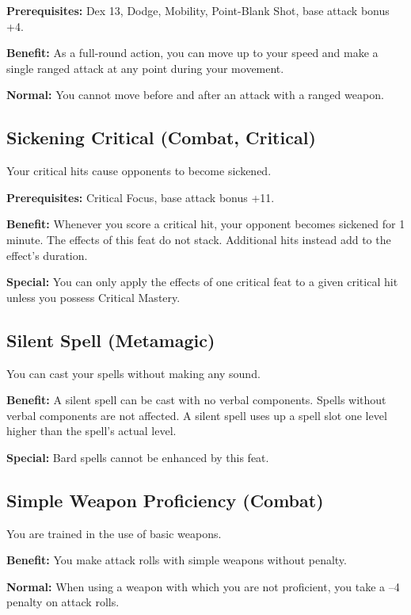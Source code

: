 \textbf{Prerequisites:} Dex 13, Dodge, Mobility, Point-Blank Shot, base attack bonus +4.
				
\textbf{Benefit:} As a full-round action, you can move up to your speed and make a single ranged attack at any point during your movement.
				
\textbf{Normal:} You cannot move before and after an attack with a ranged weapon.
				
\subsection{Sickening Critical (Combat, Critical)}

				
Your critical hits cause opponents to become sickened.
				
\textbf{Prerequisites:} Critical Focus, base attack bonus +11.
				
\textbf{Benefit:} Whenever you score a critical hit, your opponent becomes sickened for 1 minute. The effects of this feat do not stack. Additional hits instead add to the effect's duration.
				
\textbf{Special:} You can only apply the effects of one critical feat to a given critical hit unless you possess Critical Mastery.
				
\subsection{Silent Spell (Metamagic)}

				
You can cast your spells without making any sound.
				
\textbf{Benefit:} A silent spell can be cast with no verbal components. Spells without verbal components are not affected. A silent spell uses up a spell slot one level higher than the spell's actual level.
				
\textbf{Special:} Bard spells cannot be enhanced by this feat.
				
\subsection{Simple Weapon Proficiency (Combat)}

				
You are trained in the use of basic weapons.
				
\textbf{Benefit:} You make attack rolls with simple weapons without penalty.
				
\textbf{Normal:} When using a weapon with which you are not proficient, you take a --4 penalty on attack rolls.
				
